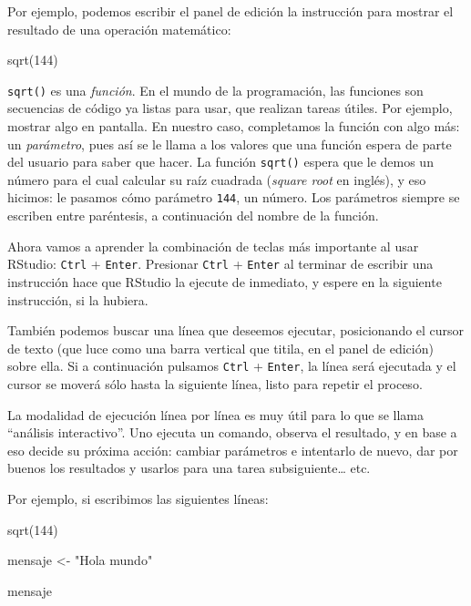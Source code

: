 \documentclass[
]{book}
\newenvironment{Shaded}{\begin{snugshade}}{\end{snugshade}}
\newcommand{\DecValTok}[1]{\textcolor[rgb]{0.00,0.00,0.81}{#1}}
\newcommand{\FunctionTok}[1]{\textcolor[rgb]{0.00,0.00,0.00}{#1}}
\newcommand{\NormalTok}[1]{#1}
\newcommand{\OtherTok}[1]{\textcolor[rgb]{0.56,0.35,0.01}{#1}}
\newcommand{\StringTok}[1]{\textcolor[rgb]{0.31,0.60,0.02}{#1}}
\begin{document}
Por ejemplo, podemos escribir el panel de edición la instrucción para mostrar el resultado de una operación matemático:

\begin{Shaded}
\begin{Highlighting}[]
\FunctionTok{sqrt}\NormalTok{(}\DecValTok{144}\NormalTok{)}
\end{Highlighting}
\end{Shaded}

\texttt{sqrt()} es una \emph{función}. En el mundo de la programación, las funciones son secuencias de código ya listas para usar, que realizan tareas útiles. Por ejemplo, mostrar algo en pantalla. En nuestro caso, completamos la función con algo más: un \emph{parámetro}, pues así se le llama a los valores que una función espera de parte del usuario para saber que hacer. La función \texttt{sqrt()} espera que le demos un número para el cual calcular su raíz cuadrada (\emph{square root} en inglés), y eso hicimos: le pasamos cómo parámetro \texttt{144}, un número. Los parámetros siempre se escriben entre paréntesis, a continuación del nombre de la función.

Ahora vamos a aprender la combinación de teclas más importante al usar RStudio: \texttt{Ctrl} + \texttt{Enter}. Presionar \texttt{Ctrl} + \texttt{Enter} al terminar de escribir una instrucción hace que RStudio la ejecute de inmediato, y espere en la siguiente instrucción, si la hubiera.

También podemos buscar una línea que deseemos ejecutar, posicionando el cursor de texto (que luce como una barra vertical que titila, en el panel de edición) sobre ella. Si a continuación pulsamos \texttt{Ctrl} + \texttt{Enter}, la línea será ejecutada y el cursor se moverá sólo hasta la siguiente línea, listo para repetir el proceso.

La modalidad de ejecución línea por línea es muy útil para lo que se llama ``análisis interactivo''. Uno ejecuta un comando, observa el resultado, y en base a eso decide su próxima acción: cambiar parámetros e intentarlo de nuevo, dar por buenos los resultados y usarlos para una tarea subsiguiente\ldots{} etc.

Por ejemplo, si escribimos las siguientes líneas:

\begin{Shaded}
\begin{Highlighting}[]
\FunctionTok{sqrt}\NormalTok{(}\DecValTok{144}\NormalTok{)}

\NormalTok{mensaje }\OtherTok{\textless{}{-}} \StringTok{"Hola mundo"}

\NormalTok{mensaje}
\end{Highlighting}
\end{Shaded}
\end{document}
